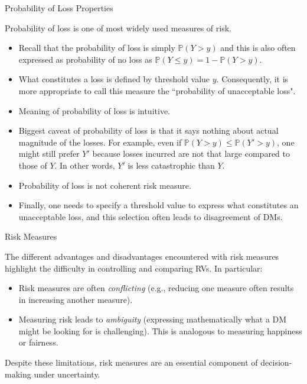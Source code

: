 \documentclass[9pt]{beamer}
\begin{document}
%
\begin{frame}{Probability of Loss Properties}


Probability of loss is one of most widely used measures of risk.  

\begin{itemize}
\setlength{\itemsep}{10pt}
\item Recall that the probability of loss is simply $\mathbb{P}(Y>y)$ and this is also often expressed as probability of no loss as $\mathbb{P}(Y\leq y)=1-\mathbb{P}(Y>y)$. 

\item What constitutes a loss is defined by threshold value $y$. Consequently, it is more appropriate to call this measure the  ``probability of unacceptable loss". 

\item Meaning of probability of loss is intuitive. 

\item Biggest caveat of probability of loss is that it says nothing about actual magnitude of the losses.  For example, even if $\mathbb{P}(Y>y)\leq \mathbb{P}(Y'>y)$, one might still prefer $Y'$ because losses incurred are not that large compared to those of $Y$.  In other words, $Y'$ is less catastrophic than $Y$. 

\item Probability of loss is not coherent risk measure. 

\item Finally, one needs to specify a threshold value to express what constitutes an unacceptable loss, and this selection often leads to disagreement of DMs.

\end{itemize}

\end{frame}


%
\begin{frame}{Risk Measures}

The different advantages and disadvantages encountered with risk measures highlight the difficulty in controlling and comparing RVs. In particular:

\begin{itemize}
\setlength{\itemsep}{10pt}
\item Risk measures are often {\em conflicting} (e.g., reducing one measure often results in increasing another measure). 
\item Measuring risk leads to {\em ambiguity} (expressing mathematically what a DM might be looking for is challenging). This is analogous to measuring happiness or fairness. 
\end{itemize}
Despite these limitations, risk measures are an essential component of decision-making under uncertainty.

\end{frame}
\end{document}
